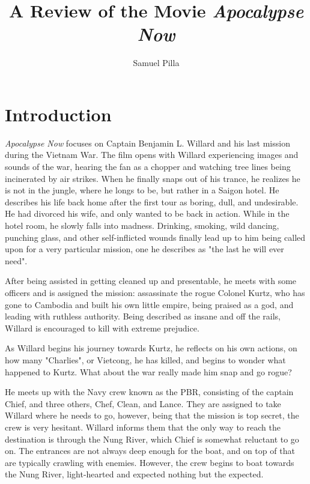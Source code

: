 \documentclass[a4paper,man,natbib]{apa6}
\title{A Review of the Movie \textit{Apocalypse Now}}
\author{Samuel Pilla}
\affiliation{Missouri University of Science and Technology}
\begin{document}
\maketitle

\section{Introduction}

\textit{Apocalypse Now} focuses on Captain Benjamin L. Willard and his last mission during the Vietnam War. The film opens with Willard experiencing images and sounds of the war, hearing the fan as a chopper and watching tree lines being incinerated by air strikes. When he finally snaps out of his trance, he realizes he is not in the jungle, where he longs to be, but rather in a Saigon hotel. He describes his life back home after the first tour as boring, dull, and undesirable. He had divorced his wife, and only wanted to be back in action. While in the hotel room, he slowly falls into madness. Drinking, smoking, wild dancing, punching glass, and other self-inflicted wounds finally lead up to him being called upon for a very particular mission, one he describes as "the last he will ever need".

After being assisted in getting cleaned up and presentable, he meets with some officers and is assigned the mission: assassinate the rogue Colonel Kurtz, who has gone to Cambodia and built his own little empire, being praised as a god, and leading with ruthless authority. Being described as insane and off the rails, Willard is encouraged to kill with extreme prejudice.

As Willard begins his journey towards Kurtz, he reflects on his own actions, on how many "Charlies", or Vietcong, he has killed, and begins to wonder what happened to Kurtz. What about the war really made him snap and go rogue?

He meets up with the Navy crew known as the PBR, consisting of the captain Chief, and three others, Chef, Clean, and Lance. They are assigned to take Willard where he needs to go, however, being that the mission is top secret, the crew is very hesitant. Willard informs them that the only way to reach the destination is through the Nung River, which Chief is somewhat reluctant to go on. The entrances are not always deep enough for the boat, and on top of that are typically crawling with enemies. However, the crew begins to boat towards the Nung River, light-hearted and expected nothing but the expected.
\end{document}
